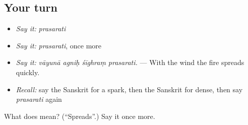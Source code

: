 \subsection*{Your turn}
\begin{itemize}
\raggedright
  \item \emph{Say it:} \emph{prasarati}
  \item \emph{Say it:} \emph{prasarati}, once more
  \item \emph{Say it:} \emph{vāyunā agniḥ śīghraṃ prasarati.} — With the wind the fire spreads quickly.
  \item \emph{Recall:} say the Sanskrit for a spark, then the Sanskrit for dense, then say \emph{prasarati} again
\end{itemize}

\begin{tcolorbox}[breakable,colback=teal!4,colframe=teal!35!black,title={Before you move on}]
What does  mean? (\textquotedblleft{}Spreads\textquotedblright{}.) Say it once more.
\end{tcolorbox}
